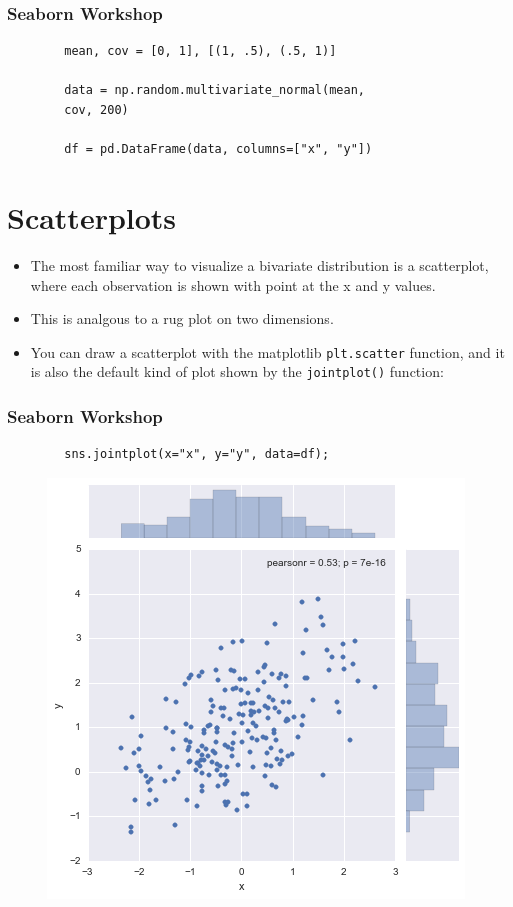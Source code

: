 \documentclass{beamer}
\begin{document}
\begin{frame}[fragile]
	\frametitle{Seaborn Workshop}
	\large
	\begin{framed}
		\begin{verbatim}
		mean, cov = [0, 1], [(1, .5), (.5, 1)]
		
		data = np.random.multivariate_normal(mean, 
		cov, 200)
		
		df = pd.DataFrame(data, columns=["x", "y"])
		\end{verbatim}
	\end{framed}
	
\end{frame}
\section{Scatterplots}
\begin{frame}[fragile]
	\large
	\begin{itemize}
		\item The most familiar way to visualize a bivariate distribution is a scatterplot, where each observation is shown with point at the x and y values. 
		\item This is analgous to a rug plot on two dimensions. 
		\item You can draw a scatterplot with the matplotlib \texttt{plt.scatter} function, and it is also the default kind of plot shown by the \texttt{jointplot()} function:
	\end{itemize}
	
	
\end{frame}

\begin{frame}[fragile]
	\frametitle{Seaborn Workshop}
	\large
	\begin{framed}
		\begin{verbatim}
		sns.jointplot(x="x", y="y", data=df);
		\end{verbatim}
	\end{framed}
	\begin{figure}
		\centering
		\includegraphics[width=0.55\linewidth]{images/distributions_30_0}
	\end{figure}
	
\end{frame}
\end{document}
